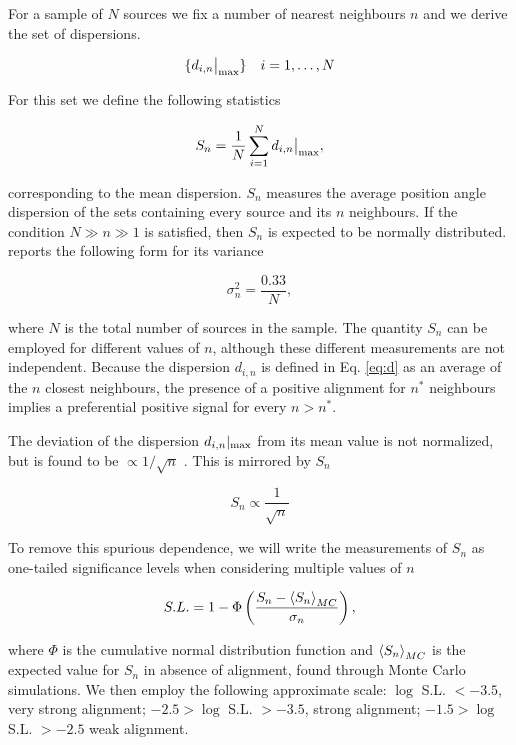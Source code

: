 		
		For a sample of $N$ sources we fix a number of nearest neighbours $n$ and we derive the set of dispersions.
		
		\begin{align}
			\{d_{i, n}\big|_{\rm{max}}\} && i =1, \dots, N
		\end{align}
		
		For this set we define the following statistics
		
		\begin{align}
			S_{n} = \frac{1}{N} \sum_{i=1}^{N} d_{i, n}\big|_{\rm{max}},
			\label{eq:S}
		\end{align}

		corresponding to the mean dispersion. $S_n$ measures the average position angle dispersion of the sets containing every source and its $n$ neighbours.  
		If the condition $N \gg n \gg 1$ is satisfied, then $S_{n}$ is expected to be normally distributed. \citeauthor{Jain2004} reports the following form for its variance
		
		\begin{equation}
		\sigma_n^2 = \frac{0.33}{N},
		\label{eq:sigmaest}
		\end{equation} 
		
		where $N$ is the total number of sources in the sample. 
		The quantity $S_n$ can be employed for different values of $n$, although these different measurements are not independent. Because the dispersion $d_{i, n}$ is defined in Eq. \eqref{eq:d} as an average of the $n$ closest neighbours, the presence of a positive alignment for $n^\ast$ neighbours implies a preferential positive signal for every $n>n^\ast$.
		
		The deviation of the dispersion $d_{i, n}|_{\rm{max}}$ from its mean value is not normalized, but is found to be $\propto 1/\sqrt{n}$ \citep{Jain2004}. This is mirrored by $S_n$
		
		\begin{equation}
			S_n \propto \frac{1}{\sqrt{n}}
			\label{eq:Sest}
		\end{equation}
		
		To remove this spurious dependence, we will write the measurements of $S_n$ as one-tailed significance levels when considering multiple values of $n$
	
		\begin{equation}
			S.L. = 1-\Phi \left( \frac{S_n - \left\langle S_n \right\rangle_{MC}}{\sigma_n}\right),
			\label{eq:SL}
		\end{equation}
		
		where $\Phi$ is the cumulative normal distribution function and $\left\langle S_n \right\rangle_{MC}$ is the expected value for $S_n$ in absence of alignment, found through Monte Carlo simulations.
		We then employ the following approximate scale: $\log$ S.L. $< -3.5$, very strong alignment;  $-2.5>\log$ S.L. $> -3.5$, strong alignment; $-1.5>\log$ S.L. $> -2.5$ weak alignment.
		
